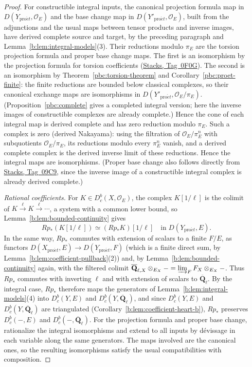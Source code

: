 \documentclass[11pt,a4paper]{article}
\numberwithin{equation}{section}
\theoremstyle{definition}
\theoremstyle{remark}
\newcommand{\D}{D}
\newcommand{\Dbc}{D^b_c}
\newcommand{\Qbar}{\overline{\mathbf Q}_\ell}
\newcommand{\proet}{\mathrm{pro}\acute{e}t}
\newcommand{\stacks}[1]{\href{https://stacks.math.columbia.edu/tag/#1}{\textnormal{Stacks, Tag~#1}}}
\newcommand{\QbarX}{\overline{\mathbf Q}_{\ell,X}}
\begin{document}
\begin{proof}
For constructible integral inputs, the canonical projection formula map
in $\D(Y_{\proet},\mathcal O_E)$ and the base change map in
$\D(Y'_{\proet},\mathcal O_E)$, built from the adjunctions and the usual maps between
tensor products and inverse images, have derived complete source and
target, by the preceding paragraph and
Lemma~\ref{b:lem:integral-models}(3). Their reductions modulo $\pi_E$ are
the torsion projection formula and proper base change maps. The first is
an isomorphism by the projection formula for torsion coefficients
(\stacks{0F0G}). The second is an isomorphism by
Theorem~\ref{pbc:torsion-theorem} and
Corollary~\ref{pbc:proet-finite}: the finite reductions are bounded
below classical complexes, so their canonical exchange maps are
isomorphisms in $\D(Y'_{\proet},\mathcal O_E/\pi_E)$. (Proposition~\ref{pbc:complete} gives a completed
integral version; here the inverse images of constructible complexes
are already complete.) Hence the cone of each integral map is derived complete
and has zero reduction modulo $\pi_E$. Such a complex is zero (derived
Nakayama): using the filtration of $\mathcal O_E/\pi_E^n$ with
subquotients $\mathcal O_E/\pi_E$, its reductions modulo every $\pi_E^n$
vanish, and a derived complete complex is the derived inverse limit of
these reductions. Hence the integral maps are isomorphisms. (Proper base
change also follows directly from \stacks{09C9}, since the inverse image
of a constructible integral complex is already derived complete.)

\emph{Rational coefficients.} For $K\in\Dbc(X,\mathcal O_E)$, the complex
$K[1/\ell]$ is the colimit of $K\xrightarrow{\ell}K\xrightarrow{\ell}\cdots$,
a system with a common lower bound, so
Lemma~\ref{b:lem:bounded-continuity} gives
\[
 Rp_*(K[1/\ell])\simeq(Rp_*K)[1/\ell]\quad\text{in }\D(Y_{\proet},E).
\]
In the same way, $Rp_*$ commutes with extension of scalars to a finite
$F/E$, as functors $\D(X_{\proet},E)\to\D(Y_{\proet},F)$ (which is a finite direct sum, by
Lemma~\ref{b:lem:coefficient-pullback}(2)) and, by
Lemma~\ref{b:lem:bounded-continuity} again, with the filtered colimit
$\QbarX\otimes_{E_X}-=\varinjlim_F F_X\otimes_{E_X}-$. Thus $Rp_*$
commutes with inverting $\ell$ and with extension of scalars to $\Qbar$.
By the integral case, $Rp_*$ therefore maps the generators of
Lemma~\ref{b:lem:integral-models}(4) into $\Dbc(Y,E)$ and $\Dbc(Y,\Qbar)$,
and since $\Dbc(Y,E)$ and $\Dbc(Y,\Qbar)$ are triangulated
(Corollary~\ref{b:lem:coefficient-heart-b}), $Rp_*$ preserves
$\Dbc(-,E)$ and $\Dbc(-,\Qbar)$. For the projection formula and proper
base change, rationalize the integral isomorphisms and extend to all
inputs by d\'evissage in each variable along the same generators. The
maps involved are the canonical ones, so the resulting isomorphisms
satisfy the usual compatibilities with composition.
\end{proof}
\end{document}
